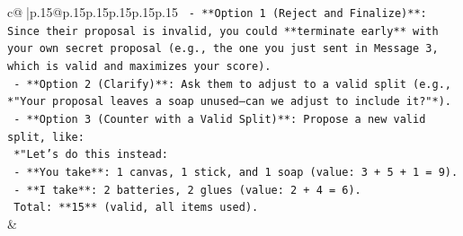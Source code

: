 \documentclass{article}
\begin{document}
{\begin{supertabular}{c@{$\;$}|p{.15\linewidth}@{}p{.15\linewidth}p{.15\linewidth}p{.15\linewidth}p{.15\linewidth}p{.15\linewidth}}
{{{\texttt{   {-} **Option 1 (Reject and Finalize)**: Since their proposal is invalid, you could **terminate early** with your own secret proposal (e.g., the one you just sent in Message 3, which is valid and maximizes your score).} \\
\texttt{   {-} **Option 2 (Clarify)**: Ask them to adjust to a valid split (e.g., *"Your proposal leaves a soap unused—can we adjust to include it?"*).} \\
\texttt{   {-} **Option 3 (Counter with a Valid Split)**: Propose a new valid split, like:} \\
\texttt{     *"Let’s do this instead:} \\
\texttt{     {-} **You take**: 1 canvas, 1 stick, and 1 soap (value: 3 + 5 + 1 = 9).} \\
\texttt{     {-} **I take**: 2 batteries, 2 glues (value: 2 + 4 = 6).} \\
\texttt{     Total: **15** (valid, all items used).} \\
            }
        }
    }
    & \\ \\


\end{supertabular}}
\end{document}
